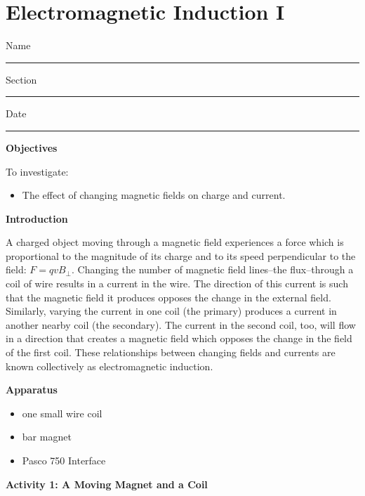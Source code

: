 
\section{Electromagnetic Induction I}

Name \rule{2.0in}{0.1pt}\hfill{}Section \rule{1.0in}{0.1pt}\hfill{}Date
\rule{1.0in}{0.1pt}

\textbf{Objectives}

To investigate:

\begin{itemize}
\item The effect of changing magnetic fields on charge and current.
\end{itemize}
\textbf{Introduction} 

A charged object moving through a magnetic field experiences a force
which is proportional to the magnitude of its charge and to its speed
perpendicular to the field: $F = qvB_\perp$. Changing the number of
magnetic field lines--the flux--through a coil of wire results in
a current in the wire. The direction of this current is such that
the magnetic field it produces opposes the change in the external
field. Similarly, varying the current in one coil (the primary) produces
a current in another nearby coil (the secondary). The current in the
second coil, too, will flow in a direction that creates a magnetic
field which opposes the change in the field of the first coil. These relationships between changing fields and currents are known collectively as electromagnetic induction.

\textbf{Apparatus} 

\begin{itemize}
\item one small wire coil
\item bar magnet
\item Pasco 750 Interface
\end{itemize}
\textbf{Activity 1: A Moving Magnet and a Coil}

